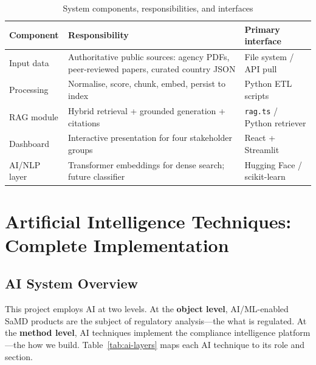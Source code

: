 \begin{table}[htbp]
\centering
\caption{System components, responsibilities, and interfaces}
\label{tab:components}
\begin{tabular}{@{}p{2.5cm}p{5.0cm}p{4.0cm}@{}}
\toprule
\textbf{Component} & \textbf{Responsibility} & \textbf{Primary interface} \\
\midrule
Input data & Authoritative public sources: agency PDFs, peer-reviewed papers, curated country JSON & File system / API pull \\
Processing & Normalise, score, chunk, embed, persist to index & Python ETL scripts \\
RAG module & Hybrid retrieval + grounded generation + citations & \texttt{rag.ts} / Python retriever \\
Dashboard & Interactive presentation for four stakeholder groups & React + Streamlit \\
AI/NLP layer & Transformer embeddings for dense search; future classifier & Hugging Face / scikit-learn \\
\bottomrule
\end{tabular}
\end{table}



\section{Artificial Intelligence Techniques: Complete Implementation}
\label{sec:ai-full}

\subsection{AI System Overview}
\label{sec:ai-overview}

This project employs AI at two levels. At the \textbf{object level}, AI/ML-enabled
SaMD products are the subject of regulatory analysis---the what is regulated. At the
\textbf{method level}, AI techniques implement the compliance intelligence
platform---the how we build. Table~\ref{tab:ai-layers} maps each AI technique to its
role and section.


